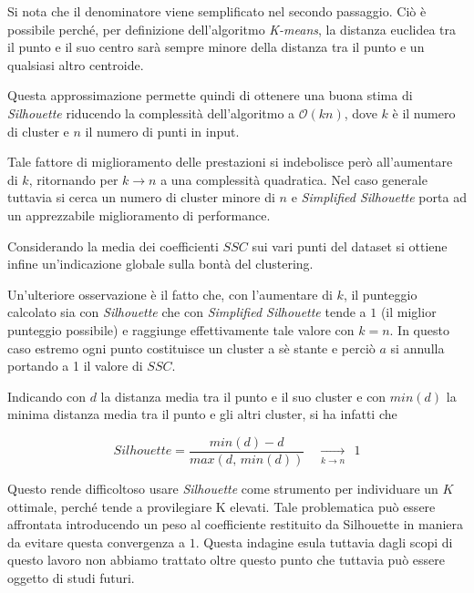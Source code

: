 \documentclass[
	11pt, %
	a4paper, %
	oneside, %
	headinclude,footinclude, %
	BCOR5mm, %
]{scrartcl}
\begin{document}
			Si nota che il denominatore viene semplificato nel secondo passaggio.
			Ciò è possibile perché, per definizione dell'algoritmo \emph{K-means}, la distanza euclidea tra il punto e il suo centro sarà sempre minore della distanza tra il punto e un qualsiasi altro centroide.
			

			Questa approssimazione permette quindi di ottenere una buona stima di \emph{Silhouette}\cite{ssc} riducendo la complessità dell'algoritmo a $\mathcal{O}(kn)$, dove $k$ è il numero di cluster e $n$ il numero di punti in input.
			
			Tale fattore di miglioramento delle prestazioni si indebolisce però all'aumentare di $k$, ritornando per $k \to n$ a una complessità quadratica. 
			Nel caso generale tuttavia si cerca un numero di cluster minore di $n$ e \emph{Simplified Silhouette} porta ad un apprezzabile miglioramento di performance.

			Considerando la media dei coefficienti $SSC$ sui vari punti del dataset si ottiene infine un'indicazione globale sulla bontà del clustering.

			\smallbreak
			Un'ulteriore osservazione è il fatto che, con l'aumentare di $k$, il punteggio calcolato sia con \emph{Silhouette} che con \emph{Simplified Silhouette} tende a $1$ (il miglior punteggio possibile) e raggiunge effettivamente tale valore con $k = n$.
			In questo caso estremo ogni punto costituisce un cluster a sè stante e perciò $a$ si annulla portando a 1 il valore di $SSC$.
			
			Indicando con $d$ la distanza media tra il punto e il suo cluster e con $min(d)$ la minima distanza media tra il punto e gli altri cluster, si ha infatti che

			\begin{equation} \label{eq:silhouetteToOne}
				Silhouette = \frac{min(d) - d}{ max(d, \,min(d)) } \quad \xrightarrow [k \to n] \quad ~~ 1 \end{equation}

			Questo rende difficoltoso usare \emph{Silhouette} come strumento per individuare un $K$ ottimale, perché tende a provilegiare K elevati.
			Tale problematica può essere affrontata introducendo un peso al coefficiente restituito da Silhouette in maniera da evitare questa convergenza a $1$.
			Questa indagine esula tuttavia dagli scopi di questo lavoro non abbiamo trattato oltre questo punto che tuttavia può essere oggetto di studi futuri.
\end{document}
